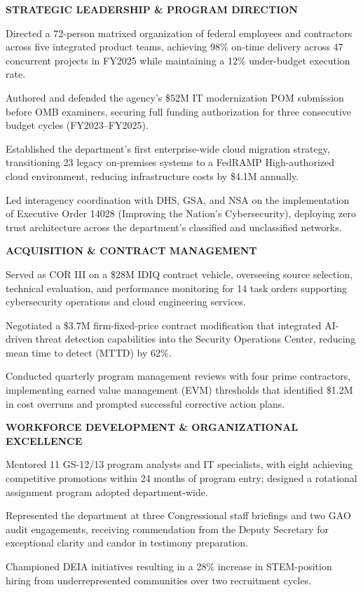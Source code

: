 \documentclass[11pt,letterpaper]{article}
\newcommand{\dutysection}[1]{%
  \par\vspace{6pt}\noindent\textbf{\footnotesize\color{Navy}\MakeUppercase{#1}}\par\vspace{2pt}%
}
\begin{document}
\dutysection{Strategic Leadership \& Program Direction}
\begin{dutylist}
  \item Directed a 72-person matrixed organization of federal employees and contractors across five integrated product teams, achieving 98\% on-time delivery across 47 concurrent projects in FY2025 while maintaining a 12\% under-budget execution rate.
  \item Authored and defended the agency's \$52M IT modernization POM submission before OMB examiners, securing full funding authorization for three consecutive budget cycles (FY2023--FY2025).
  \item Established the department's first enterprise-wide cloud migration strategy, transitioning 23 legacy on-premises systems to a FedRAMP High-authorized cloud environment, reducing infrastructure costs by \$4.1M annually.
  \item Led interagency coordination with DHS, GSA, and NSA on the implementation of Executive Order 14028 (Improving the Nation's Cybersecurity), deploying zero trust architecture across the department's classified and unclassified networks.
\end{dutylist}

\dutysection{Acquisition \& Contract Management}
\begin{dutylist}
  \item Served as COR III on a \$28M IDIQ contract vehicle, overseeing source selection, technical evaluation, and performance monitoring for 14 task orders supporting cybersecurity operations and cloud engineering services.
  \item Negotiated a \$3.7M firm-fixed-price contract modification that integrated AI-driven threat detection capabilities into the Security Operations Center, reducing mean time to detect (MTTD) by 62\%.
  \item Conducted quarterly program management reviews with four prime contractors, implementing earned value management (EVM) thresholds that identified \$1.2M in cost overruns and prompted successful corrective action plans.
\end{dutylist}

\dutysection{Workforce Development \& Organizational Excellence}
\begin{dutylist}
  \item Mentored 11 GS-12/13 program analysts and IT specialists, with eight achieving competitive promotions within 24 months of program entry; designed a rotational assignment program adopted department-wide.
  \item Represented the department at three Congressional staff briefings and two GAO audit engagements, receiving commendation from the Deputy Secretary for exceptional clarity and candor in testimony preparation.
  \item Championed DEIA initiatives resulting in a 28\% increase in STEM-position hiring from underrepresented communities over two recruitment cycles.
\end{dutylist}
\end{document}
